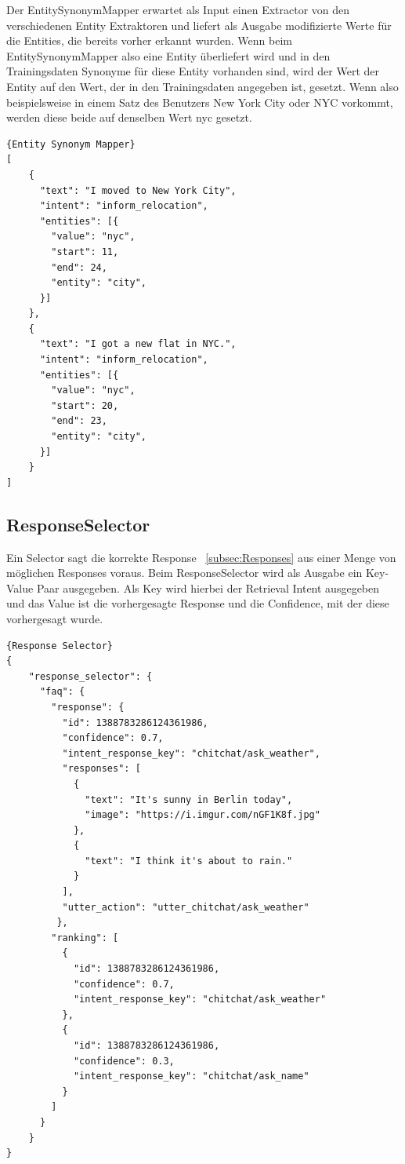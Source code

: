 Der EntitySynonymMapper erwartet als Input einen Extractor von den verschiedenen Entity Extraktoren und liefert als Ausgabe modifizierte Werte für die Entities, die bereits vorher erkannt wurden.
Wenn beim EntitySynonymMapper also eine Entity überliefert wird und in den Trainingsdaten Synonyme für diese Entity vorhanden sind, wird der Wert der Entity auf den Wert, der in den Trainingsdaten angegeben ist, gesetzt.
Wenn also beispielsweise in einem Satz des Benutzers New York City oder NYC vorkommt, werden diese beide auf denselben Wert nyc gesetzt.\cite{entitySynonymMapper}

\begin{lstlisting}[label={lst:entity-synonym-mapper},caption={Entity Synonym Mapper}]{Entity Synonym Mapper}
[
    {
      "text": "I moved to New York City",
      "intent": "inform_relocation",
      "entities": [{
        "value": "nyc",
        "start": 11,
        "end": 24,
        "entity": "city",
      }]
    },
    {
      "text": "I got a new flat in NYC.",
      "intent": "inform_relocation",
      "entities": [{
        "value": "nyc",
        "start": 20,
        "end": 23,
        "entity": "city",
      }]
    }
]
\end{lstlisting}

\subsection{ResponseSelector}\label{subsec:response-selector}

Ein Selector sagt die korrekte Response ~\ref{subsec:Responses} aus einer Menge von möglichen Responses voraus.
Beim ResponseSelector wird als Ausgabe ein Key-Value Paar ausgegeben.
Als Key wird hierbei der Retrieval Intent ausgegeben und das Value ist die vorhergesagte Response und die Confidence, mit der diese vorhergesagt wurde.\cite{responseSelector}

\begin{lstlisting}[label={lst:response-selector},caption={Response Classifier}]{Response Selector}
{
    "response_selector": {
      "faq": {
        "response": {
          "id": 1388783286124361986,
          "confidence": 0.7,
          "intent_response_key": "chitchat/ask_weather",
          "responses": [
            {
              "text": "It's sunny in Berlin today",
              "image": "https://i.imgur.com/nGF1K8f.jpg"
            },
            {
              "text": "I think it's about to rain."
            }
          ],
          "utter_action": "utter_chitchat/ask_weather"
         },
        "ranking": [
          {
            "id": 1388783286124361986,
            "confidence": 0.7,
            "intent_response_key": "chitchat/ask_weather"
          },
          {
            "id": 1388783286124361986,
            "confidence": 0.3,
            "intent_response_key": "chitchat/ask_name"
          }
        ]
      }
    }
}
\end{lstlisting}

